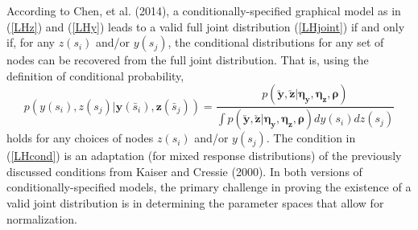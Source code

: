 \documentclass[12pt, a4paper, twoside]{article}
\begin{document}
According to Chen, et al. (2014), a conditionally-specified graphical model as in (\ref{LHz}) and (\ref{LHy}) leads to a valid full joint distribution (\ref{LHjoint}) if and only if, for any $z(s_i)$ and/or $y(s_j)$, the conditional distributions for any set of nodes can be recovered from the full joint distribution. That is, using the definition of conditional probability,
\begin{equation}\label{LHcond}
p(y(s_{i}), z(s_{j}) | \boldsymbol{y}(\bar{s}_i) , \boldsymbol{z}(\bar{s}_j)) = \frac{p(\boldsymbol{\utilde{y}},\boldsymbol{\utilde{z}} | \boldsymbol{\eta_y,\eta_z,\rho})}
{\int p(\boldsymbol{\utilde{y}},\boldsymbol{\utilde{z}} | \boldsymbol{\eta_y,\eta_z,\rho}) dy(s_{i})dz(s_{j})} 
\end{equation}
holds for any choices of nodes $z(s_i)$ and/or $y(s_j)$. The condition in (\ref{LHcond}) is an adaptation (for mixed response distributions) of the previously discussed conditions from Kaiser and Cressie (2000). In both versions of conditionally-specified models, the primary challenge in proving the existence of a valid joint distribution is in determining the parameter spaces that allow for normalization.



 
\end{document}
